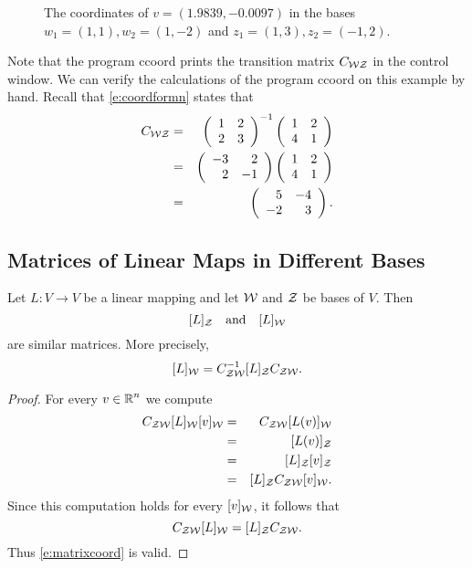 \documentclass{ximera}
\begin{document}
\begin{figure*}[htb]
     \centerline{%
	}
     \caption{The coordinates of $v=(1.9839,-0.0097)$ in the bases
	$w_1=(1,1), w_2=(1,-2)$ and $z_1=(1,3),z_2=(-1,2)$.}
     \label{F:2coords}
\end{figure*}

Note that the program {\sf ccoord} prints the transition matrix
$C_{\cal WZ}$ in the \Matlab control window.  We can verify the
calculations of the program {\sf ccoord} on this example by hand.
Recall that \eqref{e:coordformn} states that
\begin{eqnarray*}
C_{\cal WZ} & = & \left(\begin{array}{rr} 1 & 2\\ 2 &3\end{array}\right)^{-1}\left(\begin{array}{rr} 1 & 2\\ 4 &1\end{array}\right) \\
& = & \left(\begin{array}{rr} -3 & 2\\ 2 &-1\end{array}\right)\left(\begin{array}{rr} 1 & 2\\ 4 &1\end{array}\right) \\
& = & \left(\begin{array}{rr} 5 & -4\\ -2 &3\end{array}\right).
\end{eqnarray*}


\subsection*{Matrices of Linear Maps in Different Bases}

\begin{theorem} \label{T:matrixcoord}
Let $L:V\to V$ be a linear mapping and let
${\cal W}$ and ${\cal Z}$ be bases of $V$.  Then
\[
[L]_{\cal Z} \quad\mbox{and}\quad [L]_{\cal W}
\]
are similar  matrices.  More precisely,
\begin{equation}  \label{e:matrixcoord}
[L]_{\cal W} = C_{{\cal Z}{\cal W}}^{-1} [L]_{\cal Z} C_{{\cal Z}{\cal W}}.
\end{equation}
\end{theorem}

\begin{proof}  For every $v\in\mbox{$\Bbb{R}$}^n$ we compute
\begin{eqnarray*}
C_{{\cal Z}{\cal W}}[L]_{\cal W}[v]_{\cal W} & = &
C_{{\cal Z}{\cal W}}[L(v)]_{\cal W} \\
& = & [L(v)]_{\cal Z}  \\
& = & [L]_{\cal Z}[v]_{\cal Z} \\
& = & [L]_{\cal Z} C_{{\cal Z}{\cal W}}[v]_{\cal W}.
\end{eqnarray*}
Since this computation holds for every $[v]_{\cal W}$, it follows that
\[
C_{{\cal Z}{\cal W}}[L]_{\cal W} = [L]_{\cal Z} C_{{\cal Z}{\cal W}}.
\]
Thus \eqref{e:matrixcoord} is valid.  \end{proof}
\end{document}
